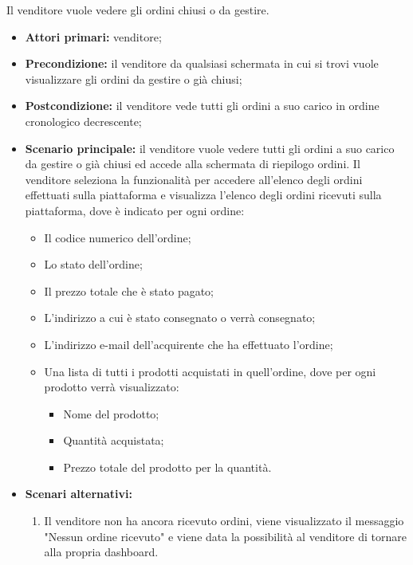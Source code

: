 \label{visualizzazione-ordini-in-gestione}

Il venditore vuole vedere gli ordini chiusi o da gestire.
\begin{itemize}
    \item \textbf{Attori primari:} venditore;
    \item \textbf{Precondizione:} il venditore da qualsiasi schermata in cui si trovi vuole visualizzare gli ordini da gestire o già chiusi;
    \item \textbf{Postcondizione:} il venditore vede tutti gli ordini a suo carico in ordine cronologico decrescente;
    \item \textbf{Scenario principale:} il venditore vuole vedere tutti gli ordini a suo carico da gestire o già chiusi ed accede alla schermata di riepilogo ordini. Il venditore seleziona la funzionalità per accedere all'elenco degli ordini effettuati sulla piattaforma e visualizza l'elenco degli ordini ricevuti sulla piattaforma, dove è indicato per ogni ordine:
    \begin{itemize}
    	\item Il codice numerico dell'ordine;
    	\item Lo stato dell'ordine;
    	\item Il prezzo totale che è stato pagato;
    	\item L'indirizzo a cui è stato consegnato o verrà consegnato;
    	\item L'indirizzo e-mail dell'acquirente che ha effettuato l'ordine;
    	\item Una lista di tutti i prodotti acquistati in quell'ordine, dove per ogni prodotto verrà visualizzato:
    	\begin{itemize}
    		\item Nome del prodotto;
    		\item Quantità acquistata;
    		\item Prezzo totale del prodotto per la quantità.
    	\end{itemize}
    \end{itemize}
	\item \textbf{Scenari alternativi:} 
	\begin{enumerate}[label=\lett]
		\item Il venditore non ha ancora ricevuto ordini, viene visualizzato il messaggio "Nessun ordine ricevuto" e viene data la possibilità al venditore di tornare alla propria dashboard.
	\end{enumerate}
\end{itemize}

